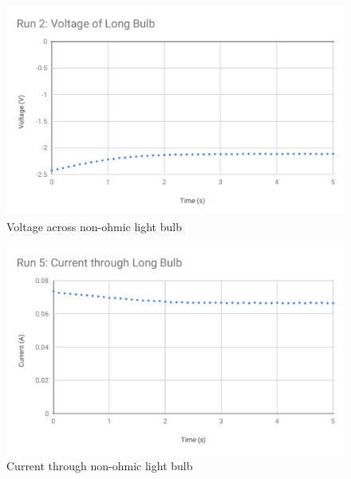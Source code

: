 \begin{figure}[ht]
	\centering
	\includegraphics[scale=0.74]{image/03-serial-parallel/bulb-V.pdf}
	\caption{Voltage across non-ohmic light bulb}
	\label{figure.03.bulb.v}
\end{figure}
\begin{figure}[ht]
	\centering
	\includegraphics[scale=0.74]{image/03-serial-parallel/bulb-I.pdf}
	\caption{Current through non-ohmic light bulb}
	\label{figure.03.bulb.i}
\end{figure}